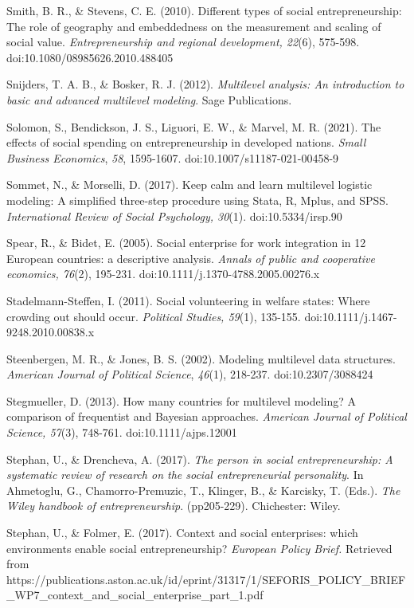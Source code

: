 \documentclass{article}
\begin{document}
Smith, B. R., \& Stevens, C. E. (2010). Different types of social entrepreneurship: The role of geography and embeddedness on the measurement and scaling of social value. \emph{Entrepreneurship and regional development, 22}(6), 575-598. doi:10.1080/08985626.2010.488405

Snijders, T. A. B., \& Bosker, R. J. (2012). \emph{Multilevel analysis: An introduction to basic and advanced multilevel }\emph{modeling}. Sage Publications.

Solomon, S., Bendickson, J. S., Liguori, E. W., \& Marvel, M. R. (2021). The effects of social spending on entrepreneurship in developed nations. \emph{Small Business Economics}, \emph{58}, 1595-1607. doi:10.1007/s11187-021-00458-9

Sommet, N., \& Morselli, D. (2017). Keep calm and learn multilevel logistic modeling: A simplified three-step procedure using Stata, R, Mplus, and SPSS. \emph{International Review of Social Psychology, 30}(1). doi:10.5334/irsp.90

Spear, R., \& Bidet, E. (2005). Social enterprise for work integration in 12 European countries: a descriptive analysis. \emph{Annals of public and cooperative economics, 76}(2), 195-231. doi:10.1111/j.1370-4788.2005.00276.x

Stadelmann-Steffen, I. (2011). Social volunteering in welfare states: Where crowding out should occur. \emph{Political Studies, 59}(1), 135-155. doi:10.1111/j.1467-9248.2010.00838.x

Steenbergen, M. R., \& Jones, B. S. (2002). Modeling multilevel data structures. \emph{American Journal of Political Science}, \emph{46}(1), 218-237. doi:10.2307/3088424 

Stegmueller, D. (2013). How many countries for multilevel modeling? A comparison of frequentist and Bayesian approaches. \emph{American Journal of Political Science, 57}(3), 748-761. doi:10.1111/ajps.12001

Stephan, U., \& Drencheva, A. (2017). \emph{The person in social entrepreneurship: A systematic review of research on the social entrepreneurial personality}. In Ahmetoglu, G., Chamorro-Premuzic, T., Klinger, B., \& Karcisky, T. (Eds.). \emph{The Wiley handbook of entrepreneurship}. (pp205-229). Chichester: Wiley. 

Stephan, U., \& Folmer, E. (2017). Context and social enterprises: which environments enable social entrepreneurship? \emph{European Policy Brief. }Retrieved from https://publications.aston.ac.uk/id/eprint/31317/1/SEFORIS\_POLICY\_BRIEF\_WP7\_context\_and\_social\_enterprise\_part\_1.pdf
\end{document}
